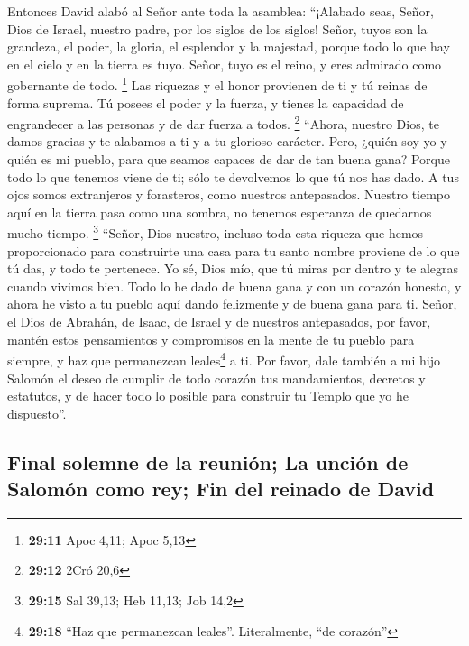  Entonces David alabó al Señor ante toda la asamblea:
``¡Alabado seas, Señor, Dios de Israel, nuestro padre, por los siglos de
los siglos!  Señor, tuyos son la grandeza, el poder, la
gloria, el esplendor y la majestad, porque todo lo que hay en el cielo y
en la tierra es tuyo. Señor, tuyo es el reino, y eres admirado como
gobernante de todo. \footnote{\textbf{29:11} Apoc 4,11; Apoc 5,13}
 Las riquezas y el honor provienen de ti y tú reinas de
forma suprema. Tú posees el poder y la fuerza, y tienes la capacidad de
engrandecer a las personas y de dar fuerza a todos. \footnote{\textbf{29:12}
  2Cró 20,6}  ``Ahora, nuestro Dios, te damos gracias y
te alabamos a ti y a tu glorioso carácter.  Pero, ¿quién
soy yo y quién es mi pueblo, para que seamos capaces de dar de tan buena
gana? Porque todo lo que tenemos viene de ti; sólo te devolvemos lo que
tú nos has dado.  A tus ojos somos extranjeros y
forasteros, como nuestros antepasados. Nuestro tiempo aquí en la tierra
pasa como una sombra, no tenemos esperanza de quedarnos mucho tiempo.
\footnote{\textbf{29:15} Sal 39,13; Heb 11,13; Job 14,2} 
``Señor, Dios nuestro, incluso toda esta riqueza que hemos proporcionado
para construirte una casa para tu santo nombre proviene de lo que tú
das, y todo te pertenece.  Yo sé, Dios mío, que tú miras
por dentro y te alegras cuando vivimos bien. Todo lo he dado de buena
gana y con un corazón honesto, y ahora he visto a tu pueblo aquí dando
felizmente y de buena gana para ti.  Señor, el Dios de
Abrahán, de Isaac, de Israel y de nuestros antepasados, por favor,
mantén estos pensamientos y compromisos en la mente de tu pueblo para
siempre, y haz que permanezcan leales\footnote{\textbf{29:18} ``Haz que
  permanezcan leales''. Literalmente, ``de corazón''} a ti.
 Por favor, dale también a mi hijo Salomón el deseo de
cumplir de todo corazón tus mandamientos, decretos y estatutos, y de
hacer todo lo posible para construir tu Templo que yo he dispuesto''.

\hypertarget{final-solemne-de-la-reuniuxf3n-la-unciuxf3n-de-salomuxf3n-como-rey-fin-del-reinado-de-david}{%
\subsection{Final solemne de la reunión; La unción de Salomón como rey;
Fin del reinado de
David}\label{final-solemne-de-la-reuniuxf3n-la-unciuxf3n-de-salomuxf3n-como-rey-fin-del-reinado-de-david}}

